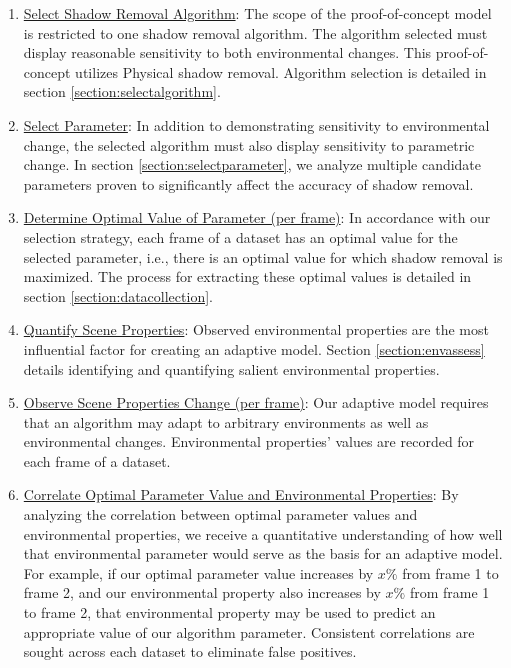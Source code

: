 \documentclass[12pt]{report}
\begin{document}
\begin{enumerate}
\item \underline{Select Shadow Removal Algorithm}: The scope of the proof-of-concept model is restricted to one shadow removal algorithm. The algorithm selected must display reasonable sensitivity to both environmental changes. This proof-of-concept utilizes Physical shadow removal. Algorithm selection is detailed in section \ref{section:selectalgorithm}.

\item \underline{Select Parameter}: In addition to demonstrating sensitivity to environmental change, the selected algorithm must also display sensitivity to parametric change. In section \ref{section:selectparameter}, we analyze multiple candidate parameters proven to significantly affect the accuracy of shadow removal.

\item \underline{Determine Optimal Value of Parameter (per frame)}: In accordance with our selection strategy, each frame of a dataset has an optimal value for the selected parameter, i.e., there is an optimal value for which shadow removal is maximized. The process for extracting these optimal values is detailed in section \ref{section:datacollection}.

\item \underline{Quantify Scene Properties}: Observed environmental properties are the most influential factor for creating an adaptive model. Section \ref{section:envassess} details identifying and quantifying salient environmental properties. 

\item \underline{Observe Scene Properties Change (per frame)}: Our adaptive model requires that an algorithm may adapt to arbitrary environments as well as environmental changes. Environmental properties' values are recorded for each frame of a dataset.

\item \underline{Correlate Optimal Parameter Value and Environmental Properties}: By analyzing the correlation between optimal parameter values and environmental properties, we receive a quantitative understanding of how well that environmental parameter would serve as the basis for an adaptive model. For example, if our optimal parameter value increases by $x\%$ from frame 1 to frame 2, and our environmental property also increases by $x\%$ from frame 1 to frame 2, that environmental property may be used to predict an appropriate value of our algorithm parameter. Consistent correlations are sought across each dataset to eliminate false positives.


\end{enumerate}
\end{document}
